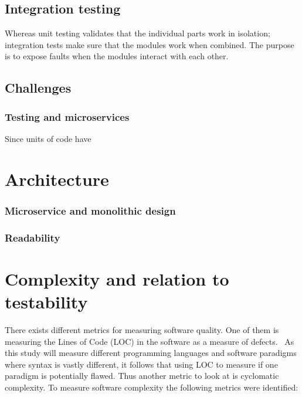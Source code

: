 \subsection{Integration testing}

Whereas unit testing validates that the individual parts work in isolation;
integration tests make sure that the modules work when combined. The purpose is
to expose faults when the modules interact with each other.

\subsection{Challenges}

\subsubsection{Testing and microservices}

Since units of code have 

\section{Architecture}

\subsubsection{Microservice and monolithic design}

\subsubsection{Readability}

\section{Complexity and relation to testability}

There exists different metrics for
measuring software quality. One of them is measuring the Lines of Code (LOC) in
the software as a measure of defects.~\cite{defectloc} As this study will
measure different programming languages and software paradigms where syntax is
vastly different, it follows that using LOC to measure if one paradigm is
potentially flawed. Thus another metric to look at is cyclomatic complexity. To
measure software complexity the following metrics were identified:

